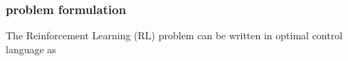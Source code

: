 \documentclass[openany]{book}
\theoremstyle{definition}
\theoremstyle{remark}
\begin{document}
\subsubsection{problem formulation}
The Reinforcement Learning (RL) problem can be written in optimal control language as 







\end{document}
